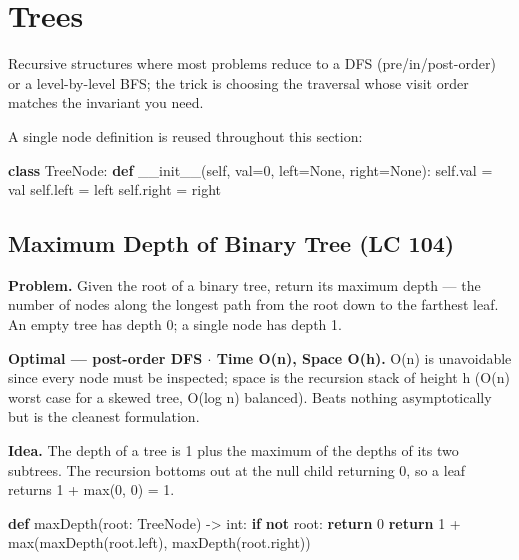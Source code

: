 \documentclass[11pt]{article}
\newenvironment{Shaded}{\begin{snugshade}}{\end{snugshade}}
\newcommand{\BuiltInTok}[1]{\textcolor[rgb]{0.50,0.55,0.55}{#1}}
\newcommand{\ControlFlowTok}[1]{\textcolor[rgb]{0.99,0.74,0.29}{\textbf{#1}}}
\newcommand{\DecValTok}[1]{\textcolor[rgb]{0.96,0.45,0.00}{#1}}
\newcommand{\FunctionTok}[1]{\textcolor[rgb]{0.56,0.27,0.68}{#1}}
\newcommand{\KeywordTok}[1]{\textcolor[rgb]{0.81,0.81,0.76}{\textbf{#1}}}
\newcommand{\NormalTok}[1]{\textcolor[rgb]{0.81,0.81,0.76}{#1}}
\newcommand{\OperatorTok}[1]{\textcolor[rgb]{0.81,0.81,0.76}{#1}}
\newcommand{\VariableTok}[1]{\textcolor[rgb]{0.15,0.68,0.68}{#1}}
\begin{document}
\section{Trees}\label{trees}

Recursive structures where most problems reduce to a DFS (pre/in/post-order) or a level-by-level BFS; the trick is choosing the traversal whose visit order matches the invariant you need.

A single node definition is reused throughout this section:


\begin{Shaded}
\begin{Highlighting}[]
\KeywordTok{class}\NormalTok{ TreeNode:}
    \KeywordTok{def} \FunctionTok{\_\_init\_\_}\NormalTok{(}\VariableTok{self}\NormalTok{, val}\OperatorTok{=}\DecValTok{0}\NormalTok{, left}\OperatorTok{=}\VariableTok{None}\NormalTok{, right}\OperatorTok{=}\VariableTok{None}\NormalTok{):}
        \VariableTok{self}\NormalTok{.val }\OperatorTok{=}\NormalTok{ val}
        \VariableTok{self}\NormalTok{.left }\OperatorTok{=}\NormalTok{ left}
        \VariableTok{self}\NormalTok{.right }\OperatorTok{=}\NormalTok{ right}
\end{Highlighting}
\end{Shaded}

\subsection{Maximum Depth of Binary Tree (LC 104)}\label{maximum-depth-of-binary-tree-lc-104}

\textbf{Problem.} Given the root of a binary tree, return its maximum depth --- the number of nodes along the longest path from the root down to the farthest leaf. An empty tree has depth 0; a single node has depth 1.

\textbf{Optimal --- post-order DFS \(\cdot\) Time O(n), Space O(h).} O(n) is unavoidable since every node must be inspected; space is the recursion stack of height h (O(n) worst case for a skewed tree, O(log n) balanced). Beats nothing asymptotically but is the cleanest formulation.

\textbf{Idea.} The depth of a tree is 1 plus the maximum of the depths of its two subtrees. The recursion bottoms out at the null child returning 0, so a leaf returns 1 + max(0, 0) = 1.


\begin{Shaded}
\begin{Highlighting}[]
\KeywordTok{def}\NormalTok{ maxDepth(root: TreeNode) }\OperatorTok{{-}\textgreater{}} \BuiltInTok{int}\NormalTok{:}
    \ControlFlowTok{if} \KeywordTok{not}\NormalTok{ root:}
        \ControlFlowTok{return} \DecValTok{0}
    \ControlFlowTok{return} \DecValTok{1} \OperatorTok{+} \BuiltInTok{max}\NormalTok{(maxDepth(root.left), maxDepth(root.right))}
\end{Highlighting}
\end{Shaded}
\end{document}
